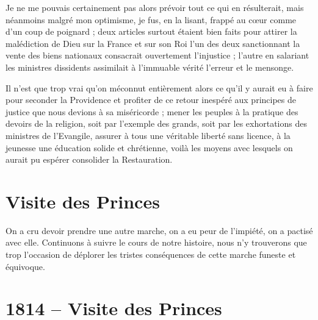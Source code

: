 \documentclass[11pt,a4paper]{report}
\begin{document}
Je ne me pouvais certainement pas alors prévoir tout ce qui en résulterait, mais néanmoins malgré mon optimisme, je fus, en la lisant, frappé au cœur comme d'un coup de poignard ; deux articles surtout étaient bien faits pour attirer la malédiction de Dieu sur la France et sur son Roi l'un des deux sanctionnant la vente des biens nationaux consacrait ouvertement l'injustice ; l'autre en salariant les ministres dissidents assimilait à l'immuable vérité l'erreur et le mensonge.

Il n'est que trop vrai qu'on méconnut entièrement alors ce qu'il y aurait eu à faire pour seconder la Providence et profiter de ce retour inespéré aux principes de justice que nous devions à sa miséricorde ; mener les peuples à la pratique des devoirs de la religion, soit par l'exemple des grands, soit par les exhortations des ministres de l'Evangile, assurer à tous une véritable liberté sans licence, à la jeunesse une éducation solide et chrétienne, voilà les moyens avec lesquels on aurait pu espérer consolider la Restauration.

\section*{Visite des Princes}

On a cru devoir prendre une autre marche, on a eu peur de l'impiété, on a pactisé avec elle. Continuons à suivre le cours de notre histoire, nous n'y trouverons que trop l'occasion de déplorer les tristes conséquences de cette marche funeste et équivoque.

\section*{1814 -- Visite des Princes}
\end{document}

